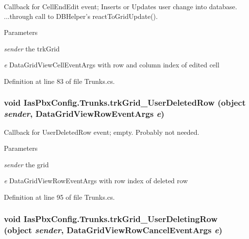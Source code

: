 Callback for CellEndEdit event; Inserts or Updates user change into database. ...through call to DBHelper's reactToGridUpdate().


\begin{DoxyParams}{Parameters}
\item[{\em sender}]the trkGrid \item[{\em e}]DataGridViewCellEventArgs with row and column index of edited cell \end{DoxyParams}


Definition at line 83 of file Trunks.cs.\hypertarget{class_ias_pbx_config_1_1_trunks_a14b41e3440a986850334bbfc0e096d37}{
\subsubsection[{trkGrid\_\-UserDeletedRow}]{\setlength{\rightskip}{0pt plus 5cm}void IasPbxConfig.Trunks.trkGrid\_\-UserDeletedRow (object {\em sender}, \/  DataGridViewRowEventArgs {\em e})}}
\label{class_ias_pbx_config_1_1_trunks_a14b41e3440a986850334bbfc0e096d37}


Callback for UserDeletedRow event; empty. Probably not needed.


\begin{DoxyParams}{Parameters}
\item[{\em sender}]the grid \item[{\em e}]DataGridViewRowEventArgs with row index of deleted row \end{DoxyParams}


Definition at line 95 of file Trunks.cs.\hypertarget{class_ias_pbx_config_1_1_trunks_a707a8fb3145ec2a85fccff41d1057532}{
\subsubsection[{trkGrid\_\-UserDeletingRow}]{\setlength{\rightskip}{0pt plus 5cm}void IasPbxConfig.Trunks.trkGrid\_\-UserDeletingRow (object {\em sender}, \/  DataGridViewRowCancelEventArgs {\em e})}}
\label{class_ias_pbx_config_1_1_trunks_a707a8fb3145ec2a85fccff41d1057532}


